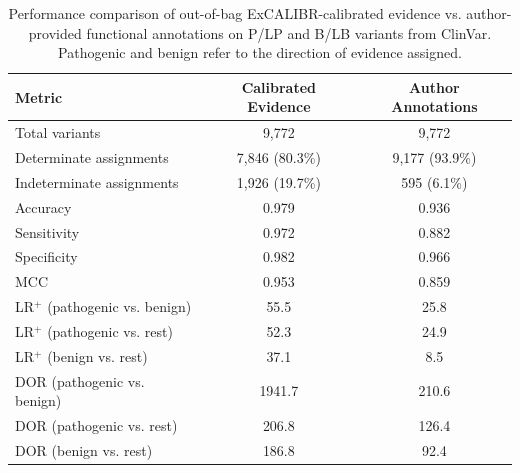 \documentclass[11pt]{article}
\theoremstyle{plain}
\newcommand{\excalibr}{ExCALIBR\xspace}
\begin{document}
\begin{table}[!htb]
\centering
\caption{Performance comparison of out-of-bag \excalibr-calibrated evidence vs. author-provided functional annotations on P/LP and B/LB variants from ClinVar. Pathogenic and benign refer to the direction of evidence assigned.}
\label{tab:author_performance}
\begin{tabular}{lcc}
\toprule
Metric & Calibrated Evidence & Author Annotations \\
\midrule
Total variants & 9,772 & 9,772 \\
Determinate assignments & 7,846 (80.3\%) & 9,177 (93.9\%) \\
Indeterminate assignments & 1,926 (19.7\%) & 595 (6.1\%) \\
\midrule
Accuracy & 0.979 & 0.936 \\
Sensitivity & 0.972 & 0.882 \\
Specificity & 0.982 & 0.966 \\
MCC & 0.953 & 0.859 \\
\midrule
LR$^+$ (pathogenic vs. benign) & 55.5 & 25.8 \\
LR$^+$ (pathogenic vs. rest) & 52.3 & 24.9 \\
LR$^+$ (benign vs. rest) & 37.1 & 8.5 \\
DOR (pathogenic vs. benign) & 1941.7 & 210.6 \\
DOR (pathogenic vs. rest) & 206.8 & 126.4 \\
DOR (benign vs. rest) & 186.8 & 92.4 \\
\bottomrule
\end{tabular}
\end{table}
\end{document}

